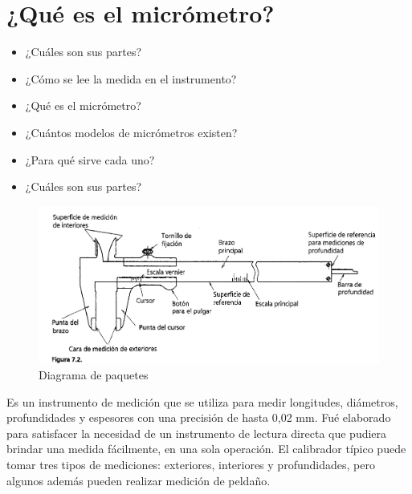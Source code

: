 \documentclass{article}
\theoremstyle{mytheoremstyle}
\theoremstyle{mytheoremstyle}
\theoremstyle{myproblemstyle}
\begin{document}
	\section{¿Qué es el micrómetro?}
	\begin{itemize}
		\item ¿Cuáles son sus partes?
	
		\item¿Cómo se lee la medida en el instrumento?
		
		\item¿Qué es el micrómetro?
	
		\item¿Cuántos modelos de micrómetros existen?
		
		\item¿Para qué sirve cada uno?
	
		\item¿Cuáles son sus partes?
	\end{itemize}

\newpage

\begin{figure}[H]
	\centering
	\includegraphics[width=1\textwidth]{partes_vernier.png}
	\caption{Diagrama de paquetes}
	\label{fig:imagen2}
\end{figure}
Es un instrumento de medición que se utiliza para medir longitudes, diámetros, profundidades
 y espesores con una precisión de hasta 0,02 mm. Fué elaborado para satisfacer la necesidad 
 de un instru­mento de lectura directa que pudiera brindar una medida fácilmente, en una sola 
 operación. El calibrador típico puede tomar tres tipos de mediciones: exteriores, 
 interiores y profundidades, pero algunos además pueden realizar medición de peldaño. 
\end{document}
